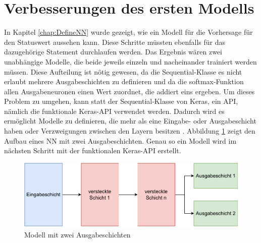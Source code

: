 \section{Verbesserungen des ersten Modells}
\label{chap:VerbesserungenNN}

In Kapitel \ref*{chap:DefineNN} wurde gezeigt, wie ein Modell für die Vorhersage für den Statuswert aussehen kann. Diese Schritte müssten ebenfalls für das dazugehörige Statement
durchlaufen werden. Das Ergebnis wären zwei unabhängige Modelle, die beide jeweils einzeln und nacheinander trainiert werden müssen. Diese Aufteilung ist nötig gewesen,
da die \glqq Sequential\grqq{}-Klasse es nicht erlaubt mehrere Ausgabeschichten zu definieren und da die \glqq softmax\grqq{}-Funktion allen Ausgabeneuronen 
einen Wert zuordnet, die addiert eins ergeben. Um dieses Problem zu umgehen, kann statt der \glqq Sequential\grqq{}-Klasse von Keras, 
ein \ac{API}, nämlich die funktionale Keras-\ac{API} verwendet werden. 
Dadurch wird es ermöglicht Modelle zu definieren, die mehr als eine Eingabe- oder Ausgabeschicht haben oder Verzweigungen zwischen den Layern besitzen \cite[vgl. S.299f.]{DL_PY}. 
Abbildung \ref*{fig:FunktionaleAPI} zeigt den Aufbau eines \ac{NN} mit zwei Ausgabeschichten. Genau so ein Modell wird im nächsten Schritt mit der funktionalen Keras-\ac{API} erstellt.

\begin{figure}[H]
    \centering
    \includegraphics[width=\textwidth]{abbildungen/NN_funktionaleAPI.pdf}
    \caption{Modell mit zwei Ausgabeschichten}
    \label{fig:FunktionaleAPI}
\end{figure}

